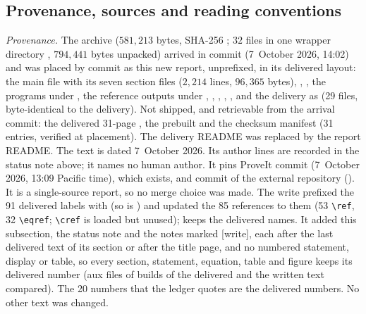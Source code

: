 \subsection{Provenance, sources and reading conventions}\label{btc:intro:provenance}
\begin{writenote}
\emph{Provenance.} The archive 
($581{,}213$ bytes, SHA-256 ; $32$ files in
one wrapper directory , $794{,}441$ bytes
unpacked) arrived
in commit  (7~October 2026, 14:02) and was placed by commit
 as this new report, unprefixed, in its delivered layout: the
main file  with its seven section files ($2{,}214$ lines,
$96{,}365$ bytes),
, , the programs under , the
reference outputs under , ,
, ,
,  and the
delivery  as  (29 files, byte-identical to
the delivery). Not shipped, and retrievable from the arrival commit: the
delivered 31-page , the prebuilt  and the
checksum manifest  (31 entries, verified at placement). The
delivery README was replaced by the report README. The text is dated
7~October 2026. Its author lines are recorded in the status note above; it
names no human author. It pins ProveIt commit
 (7~October 2026, 13:09
Pacific time), which exists, and commit
 of the external repository
 (). It is a single-source report,
so no merge choice was made. The write prefixed the 91 delivered labels with
 (so  is ) and updated the
85 references to them (53 \verb|\ref|, 32 \verb|\eqref|; \verb|\cref| is
loaded but unused);  keeps the delivered names. It
added this subsection, the status note and the notes marked [write], each
after the last delivered text of its section or after the title page, and
no numbered statement, display or table, so every section, statement,
equation, table and figure keeps its delivered number (aux files of builds
of the delivered and the written text compared). The 20 numbers that the
ledger quotes are the delivered numbers. No other text was changed.


\end{writenote}
